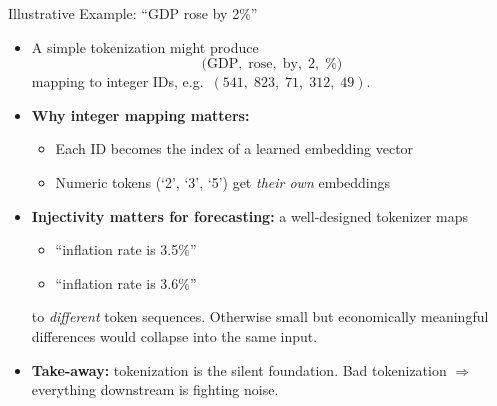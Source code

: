 \documentclass[10pt,english,aspectratio=169]{beamer}
\begin{document}
\begin{frame}{Illustrative Example: ``GDP rose by 2\%''}
\begin{itemize}
\item A simple tokenization might produce
\[
   \text{(GDP},\; \text{rose},\; \text{by},\; \text{2},\; \%\text{)}
\]
mapping to integer IDs, e.g.\ $(541,\; 823,\; 71,\; 312,\; 49)$.

\medskip
\item \textbf{Why integer mapping matters:}
\begin{itemize}
    \item Each ID becomes the index of a learned embedding vector
    \item Numeric tokens (`2', `3', `5') get \emph{their own} embeddings
\end{itemize}

\medskip
\item \textbf{Injectivity matters for forecasting:} a well-designed tokenizer maps
\begin{itemize}
    \item ``inflation rate is 3.5\%''
    \item ``inflation rate is 3.6\%''
\end{itemize}
to \emph{different} token sequences. Otherwise small but economically meaningful differences would collapse into the same input.

\medskip
\item \textbf{Take-away:} tokenization is the silent foundation. Bad tokenization $\Rightarrow$ everything downstream is fighting noise.
\end{itemize}
\end{frame}
\end{document}
